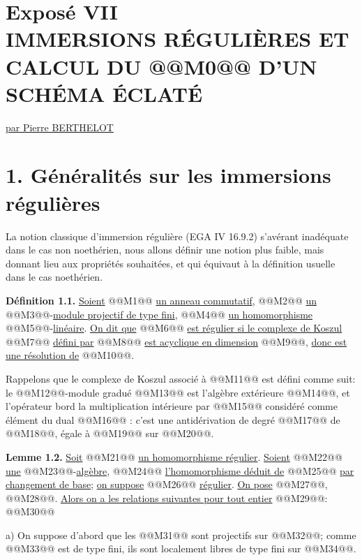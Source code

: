 
\renewcommand{\Sym}{\operatorname{Sym}}
\renewcommand{\Projz}{\operatorname{Proj}_0}
\section*{Exposé VII\\[3pt] IMMERSIONS RÉGULIÈRES ET CALCUL DU \texorpdfstring{@@M0@@}{K0} D'UN SCHÉMA ÉCLATÉ}
\begin{center}
\uline{par Pierre BERTHELOT}
\end{center}

\section*{1. Généralités sur les immersions régulières}

La notion classique d'immersion régulière (EGA IV 16.9.2) s'avérant inadéquate dans le cas non noethérien, nous allons définir une notion plus faible, mais donnant lieu aux propriétés souhaitées, et qui équivaut à la définition usuelle dans le cas noethérien.

\textbf{Définition 1.1.} \uline{Soient} @@M1@@ \uline{un anneau commutatif}, @@M2@@ \uline{un} @@M3@@-\uline{module projectif de type fini}, @@M4@@ \uline{un homomorphisme} @@M5@@-\uline{linéaire}. \uline{On dit que} @@M6@@ \uline{est régulier si le complexe de Koszul} @@M7@@ \uline{défini par} @@M8@@ \uline{est acyclique en dimension} @@M9@@, \uline{donc est une résolution de} @@M10@@.

Rappelons que le complexe de Koszul associé à @@M11@@ est défini comme suit: le @@M12@@-module gradué @@M13@@ est l'algèbre extérieure @@M14@@, et l'opérateur bord la multiplication intérieure par @@M15@@ considéré comme élément du dual @@M16@@ : c'est une antidérivation de degré @@M17@@ de @@M18@@, égale à @@M19@@ sur @@M20@@.

\textbf{Lemme 1.2.} \uline{Soit} @@M21@@ \uline{un homomorphisme régulier}. \uline{Soient} @@M22@@ \uline{une} @@M23@@-\uline{algèbre}, @@M24@@ \uline{l'homomorphisme déduit de} @@M25@@ \uline{par changement de base}; \uline{on suppose} @@M26@@ \uline{régulier}. \uline{On pose} @@M27@@, @@M28@@. \uline{Alors on a les relations suivantes pour tout entier} @@M29@@:
@@M30@@

a) On suppose d'abord que les @@M31@@ sont projectifs sur @@M32@@; comme @@M33@@ est de type fini, ils sont localement libres de type fini sur @@M34@@.
